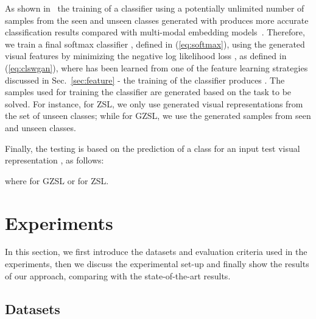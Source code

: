 \documentclass[runningheads]{llncs}
\begin{document}
As shown in~\cite{XianCVPR2018} the training of a classifier using a potentially unlimited number of samples from the seen and unseen classes generated with  produces more accurate classification results compared with multi-modal embedding models~\cite{akata2016label,frome2013devise,akata2015evaluation,romera2015embarrassingly}.  Therefore, we train a final softmax classifier , defined in (\ref{eq:softmax}), using the generated visual features by minimizing the negative log likelihood loss , as defined in (\ref{eq:clswgan}), where  has been learned from one of the feature learning strategies discussed in Sec.~\ref{sec:feature} - the training of the classifier produces . The samples used for training the classifier are generated based on the task to be solved.  For instance, for ZSL, we only use generated visual representations from the set of unseen classes; while for GZSL, we use the generated samples from seen and unseen classes.

Finally, the testing is based on the prediction of a class for an input test visual representation , as follows:

where  for GZSL or  for ZSL.

\section{Experiments}
\label{sec:experiments}

In this section, we first introduce the datasets and evaluation criteria used in the experiments, then we  discuss the experimental set-up and finally show the results of our approach, comparing with the state-of-the-art results.

\subsection{Datasets} 
\label{sec:datasets}
\end{document}
